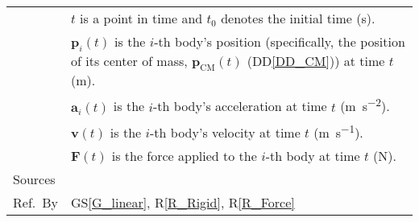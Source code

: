 \documentclass[12pt]{article}
\newcommand{\colAwidth}{0.13\textwidth}
\newcommand{\colBwidth}{0.82\textwidth}
\begin{document}
\begin{minipage}{\textwidth}
\begin{tabular}{| p{\colAwidth} | p{\colBwidth}|}
 & $t$ is a point in time and $t_0$ denotes the initial time (\si{\second}). \\
 & $\mathbf{p}_i(t)$ is the $i$-th body's position (specifically, the position of its center of mass, $\mathbf{p}_\mathrm{CM}(t)$ (DD\ref{DD_CM})) at time $t$ (\si{\metre}). \\
 & $\mathbf{a}_i(t)$ is the $i$-th body's acceleration at time $t$ (\si{\metre\per\second\tothe{2}}). \\
 & $\mathbf{v}(t)$ is the $i$-th body's velocity at time $t$ (\si{\metre\per\second}). \\
 & $\mathbf{F}(t)$ is the force applied to the $i$-th body at time $t$ (\si{\newton}). \\
  \hline
  Sources & \\
  \hline
Ref.\ By & GS\ref{G_linear}, R\ref{R_Rigid}, R\ref{R_Force} \\
  \hline
\end{tabular}
\end{minipage}

~\newline

 
\end{document}
